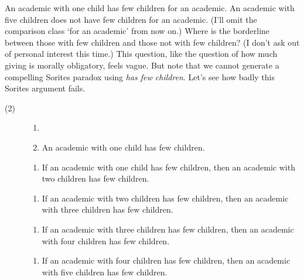 \documentclass[
  10pt,
  letterpaper,
  DIV=11,
  numbers=noendperiod,
  twoside]{scrartcl}
\providecommand{\tightlist}{%
  \setlength{\itemsep}{0pt}\setlength{\parskip}{0pt}}\usepackage{longtable,booktabs,array}
\begin{document}
An academic with one child has few children for an academic. An academic
with five children does not have few children for an academic. (I'll
omit the comparison class `for an academic' from now on.) Where is the
borderline between those with few children and those not with few
children? (I don't ask out of personal interest this time.) This
question, like the question of how much giving is morally obligatory,
feels vague. But note that we cannot generate a compelling Sorites
paradox using \emph{has few children}. Let's see how badly this Sorites
argument fails.

\begin{description}
\item[(2)]
\begin{enumerate}
\def\labelenumi{(\alph{enumi})}
\tightlist
\item[]
\item
  An academic with one child has few children.
\end{enumerate}

\begin{enumerate}
\def\labelenumi{(\alph{enumi})}
\setcounter{enumi}{1}
\tightlist
\item
  If an academic with one child has few children, then an academic with
  two children has few children.
\end{enumerate}

\begin{enumerate}
\def\labelenumi{(\alph{enumi})}
\setcounter{enumi}{2}
\tightlist
\item
  If an academic with two children has few children, then an academic
  with three children has few children.
\end{enumerate}

\begin{enumerate}
\def\labelenumi{(\alph{enumi})}
\setcounter{enumi}{3}
\tightlist
\item
  If an academic with three children has few children, then an academic
  with four children has few children.
\end{enumerate}

\begin{enumerate}
\def\labelenumi{(\alph{enumi})}
\setcounter{enumi}{4}
\tightlist
\item
  If an academic with four children has few children, then an academic
  with five children has few children.
\end{enumerate}
\end{description}
\end{document}
